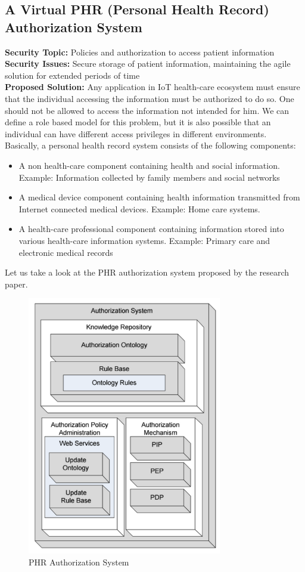 \documentclass[letterpaper, 10 pt, conference]{ieeeconf}  %
\begin{document}
\subsection{\textbf{A Virtual PHR (Personal Health Record) Authorization System}\cite{phr}}
\noindent \textbf{Security Topic:} Policies and authorization to access patient information\\
\textbf{Security Issues:} Secure storage of patient information, maintaining the agile solution for extended periods of time\\
\textbf{Proposed Solution:} 
Any application in IoT health-care ecosystem must ensure that the individual accessing the information must be authorized to do so. One should not be allowed to access the information not intended for him. We can define a role based model for this problem, but it is also possible that an individual can have different access privileges in different environments.\\
Basically, a personal health record system consists of the following components:
\begin{itemize}
\item A non health-care component containing health and social information. Example: Information collected by family members and social networks
\item A medical device component containing health information transmitted from Internet connected medical devices. Example: Home care systems.
\item A health-care professional component containing information stored into various health-care information systems. Example: Primary care and electronic medical records
\end{itemize}
Let us take a look at the PHR authorization system proposed by the research paper.
\begin{figure}[!ht]
\centering
\includegraphics[width= 8.5cm]{fig2.png}
\caption{PHR Authorization System}
\end{figure}
\end{document}
